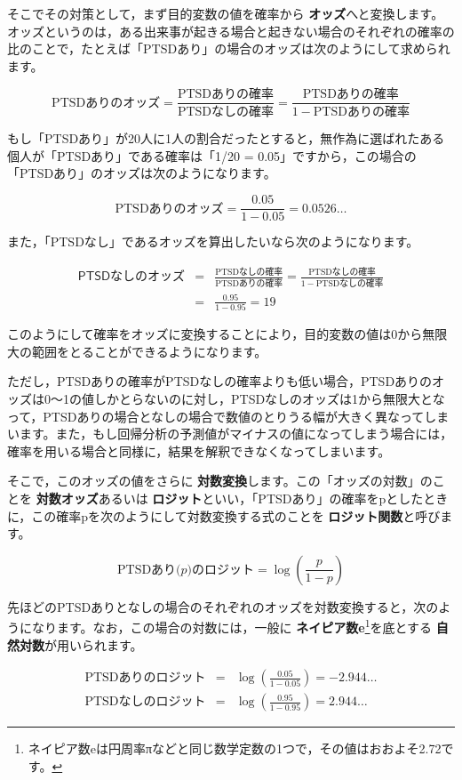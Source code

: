 \documentclass[
  12pt,
  a5jpaper,
  lualatex, ja=standard]{bxjsbook}
\renewcommand{\emph}[1]{\textbf{\color{emph} #1}}
\begin{document}
そこでその対策として，まず目的変数の値を確率から\emph{オッズ}へと変換します。オッズというのは，ある出来事が起きる場合と起きない場合のそれぞれの確率の比のことで，たとえば「PTSDあり」の場合のオッズは次のようにして求められます。

\[
\text{PTSDありのオッズ} = \frac{\text{PTSDありの確率}}{\text{PTSDなしの確率}} = \frac{\text{PTSDありの確率}}{1-\text{PTSDありの確率}}
\]

もし「PTSDあり」が20人に1人の割合だったとすると，無作為に選ばれたある個人が「PTSDあり」である確率は「1/20 = 0.05」ですから，この場合の「PTSDあり」のオッズは次のようになります。

\[ 
\text{PTSDありのオッズ} = \frac{0.05}{1-0.05} = 0.0526\dots 
\]

また，「PTSDなし」であるオッズを算出したいなら次のようになります。

\begin{eqnarray*}
\textsf{PTSDなしのオッズ} &=& \frac{\text{PTSDなしの確率}}{\text{PTSDありの確率}} = \frac{\text{PTSDなしの確率}}{1-\text{PTSDなしの確率}}\\
  &=& \frac{0.95}{1-0.95} = 19 
\end{eqnarray*}

このようにして確率をオッズに変換することにより，目的変数の値は0から無限大の範囲をとることができるようになります。

ただし，PTSDありの確率がPTSDなしの確率よりも低い場合，PTSDありのオッズは0〜1の値しかとらないのに対し，PTSDなしのオッズは1から無限大となって，PTSDありの場合となしの場合で数値のとりうる幅が大きく異なってしまいます。また，もし回帰分析の予測値がマイナスの値になってしまう場合には，確率を用いる場合と同様に，結果を解釈できなくなってしまいます。

そこで，このオッズの値をさらに\emph{対数変換}します。この「オッズの対数」のことを\emph{対数オッズ}あるいは\emph{ロジット}といい，「PTSDあり」の確率をpとしたときに，この確率pを次のようにして対数変換する式のことを\emph{ロジット関数}と呼びます。

\[
\text{PTSDあり(}p\text{)のロジット} = \log \left( \frac{p}{1-p}\right)
\]

先ほどのPTSDありとなしの場合のそれぞれのオッズを対数変換すると，次のようになります。なお，この場合の対数には，一般に\emph{ネイピア数e}\footnote{ネイピア数eは円周率πなどと同じ数学定数の1つで，その値はおおよそ2.72です。}を底とする\emph{自然対数}が用いられます。

\begin{eqnarray*}
\text{PTSDありのロジット} &=& \log \left( \frac{0.05}{1-0.05}\right) = -2.944\dots\\
\text{PTSDなしのロジット} &=& \log \left( \frac{0.95}{1-0.95}\right) = 2.944\dots
\end{eqnarray*}
\end{document}
